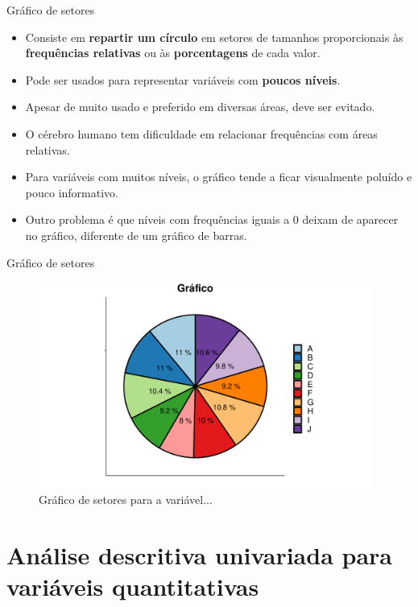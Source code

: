 \documentclass[
  ignorenonframetext,
  serif,
  professionalfont,
  usenames,
  dvipsnames,
  aspectratio = 169]{beamer}
\providecommand{\tightlist}{%
  \setlength{\itemsep}{0pt}\setlength{\parskip}{0pt}}
\renewcommand{\tightlist}{%
  \setlength{\itemsep}{0\baselineskip}
  \setlength{\parskip}{0.25\baselineskip}
}
\begin{document}
\begin{frame}{Gráfico de setores}
\protect\hypertarget{gruxe1fico-de-setores}{}
\begin{itemize}
\tightlist
\item
  Consiste em \textbf{repartir um círculo} em setores de tamanhos
  proporcionais às \textbf{frequências relativas} ou às
  \textbf{porcentagens} de cada valor.
\item
  Pode ser usados para representar variáveis com \textbf{poucos níveis}.
\item
  Apesar de muito usado e preferido em diversas áreas, deve ser evitado.
\item
  O cérebro humano tem dificuldade em relacionar frequências com áreas
  relativas.
\item
  Para variáveis com muitos níveis, o gráfico tende a ficar visualmente
  poluído e pouco informativo.
\item
  Outro problema é que níveis com frequências iguais a 0 deixam de
  aparecer no gráfico, diferente de um gráfico de barras.
\end{itemize}
\end{frame}

\begin{frame}{Gráfico de setores}
\protect\hypertarget{gruxe1fico-de-setores-1}{}
\begin{figure}

{\centering \includegraphics[width=11cm]{200-exploratoria-uni-tabelas-graficos_files/figure-beamer/unnamed-chunk-15-1} 

}

\caption{Gráfico de setores para a variável...}\label{fig:unnamed-chunk-15}
\end{figure}
\end{frame}

\hypertarget{anuxe1lise-descritiva-univariada-para-variuxe1veis-quantitativas}{%
\section{Análise descritiva univariada para variáveis
quantitativas}\label{anuxe1lise-descritiva-univariada-para-variuxe1veis-quantitativas}}
\end{document}
